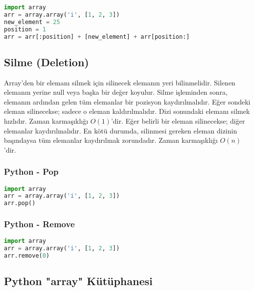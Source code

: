 \begin{lstlisting}[language=Python]
import array
arr = array.array('i', [1, 2, 3])
new_element = 25
position = 1
arr = arr[:position] + [new_element] + arr[position:]
\end{lstlisting}

\subsection{Silme (Deletion)}

Array'den bir elemanı silmek için silinecek elemanın yeri bilinmelidir. Silenen elemanın yerine null veya başka bir değer koyulur. Silme işleminden sonra, elemanın ardından gelen tüm elemanlar bir pozisyon kaydırılmalıdır. Eğer sondeki eleman silinecekse; sadece o eleman kaldırılmalıdır. Dizi sonundaki elemanı silmek hızlıdır. Zaman karmaşıklığı $O(1)$'dir. Eğer belirli bir eleman silinecekse; diğer elemanlar kaydırılmalıdır. En kötü durumda, silinmesi gereken eleman dizinin başındaysa tüm elemanlar kaydırılmak zorundadır. Zaman karmaşıklığı $O(n)$'dir.

\subsubsection{Python - Pop}

\begin{lstlisting}[language=Python]
import array
arr = array.array('i', [1, 2, 3])
arr.pop()
\end{lstlisting}

\subsubsection{Python - Remove}

\begin{lstlisting}[language=Python]
import array
arr = array.array('i', [1, 2, 3])
arr.remove(0)
\end{lstlisting}

\subsection{Python "array" Kütüphanesi}

